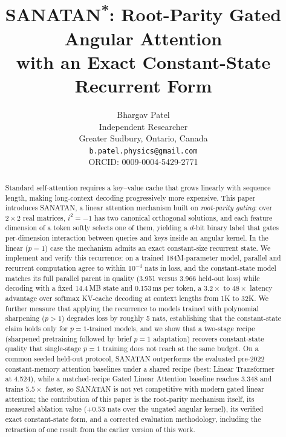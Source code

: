 \documentclass{article}
\title{SANATAN\textsuperscript{*}: Root-Parity Gated Angular Attention \\ with an Exact Constant-State Recurrent Form}
\author{
  Bhargav Patel \\
  Independent Researcher \\
  Greater Sudbury, Ontario, Canada \\
  \texttt{b.patel.physics@gmail.com} \\
  \small{ORCID: 0009-0004-5429-2771}
}
\begin{document}
\maketitle
\renewcommand{\thefootnote}{*}
\renewcommand{\thefootnote}{\arabic{footnote}}

\begin{abstract}
Standard self-attention requires a key--value cache that grows linearly with sequence length, making long-context decoding progressively more expensive. This paper introduces SANATAN, a linear attention mechanism built on \emph{root-parity gating}: over $2 \times 2$ real matrices, $i^2 = -1$ has two canonical orthogonal solutions, and each feature dimension of a token softly selects one of them, yielding a $d$-bit binary label that gates per-dimension interaction between queries and keys inside an angular kernel. In the linear ($p{=}1$) case the mechanism admits an exact constant-size recurrent state. We implement and verify this recurrence: on a trained 184M-parameter model, parallel and recurrent computation agree to within $10^{-4}$ nats in loss, and the constant-state model matches its full parallel parent in quality (3.951 versus 3.966 held-out loss) while decoding with a fixed 14.4\,MB state and 0.153\,ms per token, a $3.2\times$ to $48\times$ latency advantage over softmax KV-cache decoding at context lengths from 1K to 32K. We further measure that applying the recurrence to models trained with polynomial sharpening ($p{>}1$) degrades loss by roughly 5 nats, establishing that the constant-state claim holds only for $p{=}1$-trained models, and we show that a two-stage recipe (sharpened pretraining followed by brief $p{=}1$ adaptation) recovers constant-state quality that single-stage $p{=}1$ training does not reach at the same budget. On a common seeded held-out protocol, SANATAN outperforms the evaluated pre-2022 constant-memory attention baselines under a shared recipe (best: Linear Transformer at 4.524), while a matched-recipe Gated Linear Attention baseline reaches 3.348 and trains $5.5\times$ faster, so SANATAN is not yet competitive with modern gated linear attention; the contribution of this paper is the root-parity mechanism itself, its measured ablation value ($+0.53$ nats over the ungated angular kernel), its verified exact constant-state form, and a corrected evaluation methodology, including the retraction of one result from the earlier version of this work.
\end{abstract}
\end{document}

